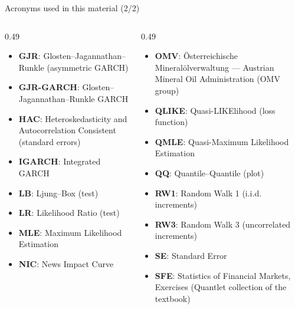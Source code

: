 \begin{frame}{Acronyms used in this material (2/2)}
\begin{columns}[T]
\begin{column}{0.49\textwidth}
\begin{itemize}\setlength{\itemsep}{0pt}
    \item \textbf{GJR}: Glosten–Jagannathan–Runkle (asymmetric GARCH)
    \item \textbf{GJR-GARCH}: Glosten–Jagannathan–Runkle GARCH
    \item \textbf{HAC}: Heteroskedasticity and Autocorrelation Consistent (standard errors)
    \item \textbf{IGARCH}: Integrated GARCH
    \item \textbf{LB}: Ljung–Box (test)
    \item \textbf{LR}: Likelihood Ratio (test)
    \item \textbf{MLE}: Maximum Likelihood Estimation
    \item \textbf{NIC}: News Impact Curve
\end{itemize}
\end{column}
\begin{column}{0.49\textwidth}
\begin{itemize}\setlength{\itemsep}{0pt}
    \item \textbf{OMV}: Österreichische Mineralölverwaltung — Austrian Mineral Oil Administration (OMV group)
    \item \textbf{QLIKE}: Quasi-LIKElihood (loss function)
    \item \textbf{QMLE}: Quasi-Maximum Likelihood Estimation
    \item \textbf{QQ}: Quantile–Quantile (plot)
    \item \textbf{RW1}: Random Walk 1 (i.i.d. increments)
    \item \textbf{RW3}: Random Walk 3 (uncorrelated increments)
    \item \textbf{SE}: Standard Error
    \item \textbf{SFE}: Statistics of Financial Markets, Exercises (Quantlet collection of the textbook)
\end{itemize}
\end{column}
\end{columns}
\end{frame}

